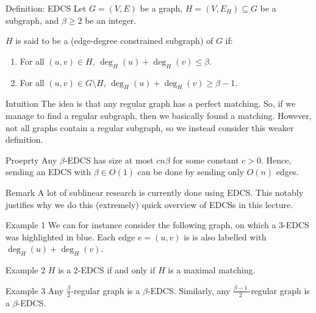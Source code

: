 \documentclass[a4paper]{article}
\begin{document}
\begin{parag}{Definition: EDCS}
    Let $G = \left(V, E\right)$ be a graph, $H = \left(V, E_H\right) \subseteq G$ be a subgraph, and $\beta \geq 2$ be an integer.

    $H$ is said to be a  (edge-degree constrained subgraph) of $G$ if:
    \begin{enumerate}
        \item For all $\left(u, v\right) \in H$, $\deg_H\left(u\right) + \deg_H\left(v\right) \leq \beta$.
        \item For all $\left(u, v\right) \in G \setminus H$, $\deg_H\left(u\right) + \deg_H\left(v\right) \geq \beta-1$.
    \end{enumerate}

    \begin{subparag}{Intuition}
        The idea is that any regular graph has a perfect matching. So, if we manage to find a regular subgraph, then we basically found a matching. However, not all graphs contain a regular subgraph, so we instead consider this weaker definition.
    \end{subparag}

    \begin{subparag}{Proeprty}
        Any $\beta$-EDCS has size at most $c n \beta$ for some constant $c > 0$. Hence, sending an EDCS with $\beta \in O\left(1\right)$ can be done by sending only $O\left(n\right)$ edges.
    \end{subparag}

    \begin{subparag}{Remark}
        A lot of sublinear research is currently done using EDCS. This notably justifies why we do this (extremely) quick overview of EDCSs in this lecture.
    \end{subparag}

    \begin{subparag}{Example 1}
        We can for instance consider the following graph, on which a 3-EDCS was highlighted in blue. Each edge $e = \left(u, v\right)$ is is also labelled with $\deg_H\left(u\right) + \deg_H\left(v\right)$.
    \end{subparag}

    \begin{subparag}{Example 2}
        $H$ is a 2-EDCS if and only if $H$ is a maximal matching.
    \end{subparag}

    \begin{subparag}{Example 3}
        Any $\frac{\beta}{2}$-regular graph is a $\beta$-EDCS. Similarly, any $\frac{\beta - 1}{2}$-regular graph is a $\beta$-EDCS.
    \end{subparag}
\end{parag}
\end{document}
